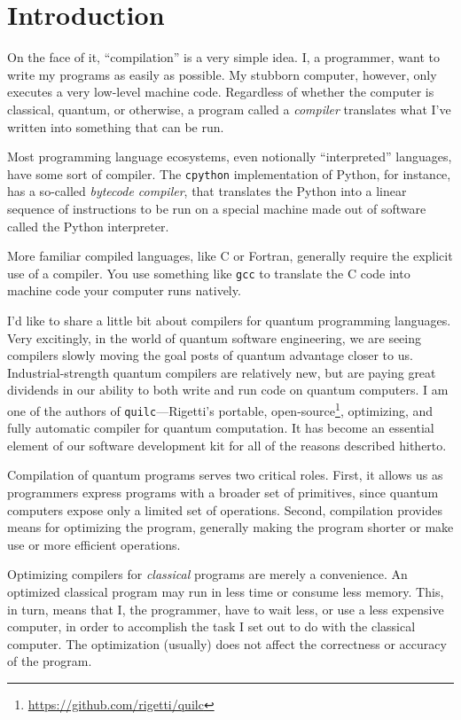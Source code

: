 \section{Introduction}
On the face of it, ``compilation'' is a very simple idea. I, a programmer, want to write my programs as easily as possible. My stubborn computer, however, only executes a very low-level machine code. Regardless of whether the computer is classical, quantum, or otherwise, a program called a \emph{compiler} translates what I've written into something that can be run.

Most programming language ecosystems, even notionally ``interpreted'' languages, have some sort of compiler. The \verb|cpython| implementation of Python, for instance, has a so-called \emph{bytecode compiler}, that translates the Python into a linear sequence of instructions to be run on a special machine made out of software called the Python interpreter.

More familiar compiled languages, like C or Fortran, generally require the explicit use of a compiler. You use something like \verb|gcc| to translate the C code into machine code your computer runs natively.

I'd like to share a little bit about compilers for quantum programming languages. Very excitingly, in the world of quantum software engineering, we are seeing compilers slowly moving the goal posts of quantum advantage closer to us. Industrial-strength quantum compilers are relatively new, but are paying great dividends in our ability to both write and run code on quantum computers. I am one of the authors of \verb|quilc|---Rigetti's portable, open-source\footnote{\url{https://github.com/rigetti/quilc}}, optimizing, and fully automatic compiler for quantum computation. It has become an essential element of our software development kit for all of the reasons described hitherto.

Compilation of quantum programs serves two critical roles. First, it allows us as programmers express programs with a broader set of primitives, since quantum computers expose only a limited set of operations. Second, compilation provides means for optimizing the program, generally making the program shorter or make use or more efficient operations.

Optimizing compilers for \emph{classical} programs are merely a convenience. An optimized classical program may run in less time or consume less memory. This, in turn, means that I, the programmer, have to wait less, or use a less expensive computer, in order to accomplish the task I set out to do with the classical computer. The optimization (usually) does not affect the correctness or accuracy of the program.

